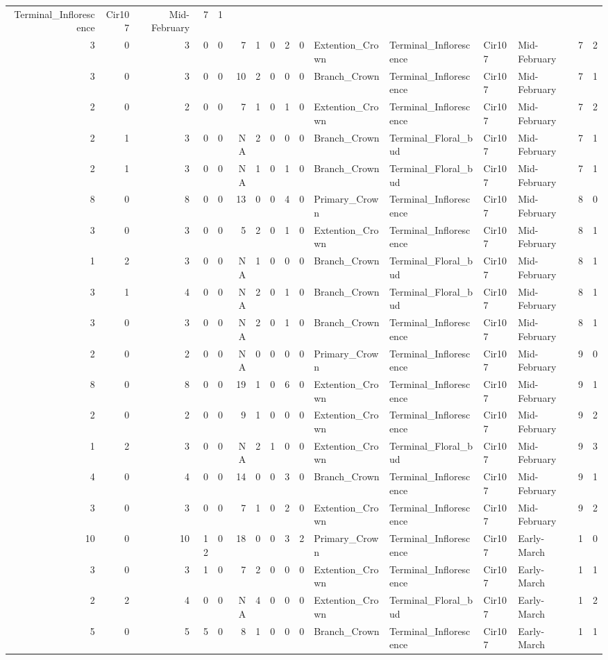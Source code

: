 \documentclass[]{article}
\begin{document}
\begin{longtable}[]{@{}rrrrrrrrrrllllrl@{}}
Terminal\_Inflorescence & Cir107 & Mid-February & 7 & 1\tabularnewline
3 & 0 & 3 & 0 & 0 & 7 & 1 & 0 & 2 & 0 & Extention\_Crown &
Terminal\_Inflorescence & Cir107 & Mid-February & 7 & 2\tabularnewline
3 & 0 & 3 & 0 & 0 & 10 & 2 & 0 & 0 & 0 & Branch\_Crown &
Terminal\_Inflorescence & Cir107 & Mid-February & 7 & 1\tabularnewline
2 & 0 & 2 & 0 & 0 & 7 & 1 & 0 & 1 & 0 & Extention\_Crown &
Terminal\_Inflorescence & Cir107 & Mid-February & 7 & 2\tabularnewline
2 & 1 & 3 & 0 & 0 & NA & 2 & 0 & 0 & 0 & Branch\_Crown &
Terminal\_Floral\_bud & Cir107 & Mid-February & 7 & 1\tabularnewline
2 & 1 & 3 & 0 & 0 & NA & 1 & 0 & 1 & 0 & Branch\_Crown &
Terminal\_Floral\_bud & Cir107 & Mid-February & 7 & 1\tabularnewline
8 & 0 & 8 & 0 & 0 & 13 & 0 & 0 & 4 & 0 & Primary\_Crown &
Terminal\_Inflorescence & Cir107 & Mid-February & 8 & 0\tabularnewline
3 & 0 & 3 & 0 & 0 & 5 & 2 & 0 & 1 & 0 & Extention\_Crown &
Terminal\_Inflorescence & Cir107 & Mid-February & 8 & 1\tabularnewline
1 & 2 & 3 & 0 & 0 & NA & 1 & 0 & 0 & 0 & Branch\_Crown &
Terminal\_Floral\_bud & Cir107 & Mid-February & 8 & 1\tabularnewline
3 & 1 & 4 & 0 & 0 & NA & 2 & 0 & 1 & 0 & Branch\_Crown &
Terminal\_Floral\_bud & Cir107 & Mid-February & 8 & 1\tabularnewline
3 & 0 & 3 & 0 & 0 & NA & 2 & 0 & 1 & 0 & Branch\_Crown &
Terminal\_Inflorescence & Cir107 & Mid-February & 8 & 1\tabularnewline
2 & 0 & 2 & 0 & 0 & NA & 0 & 0 & 0 & 0 & Primary\_Crown &
Terminal\_Inflorescence & Cir107 & Mid-February & 9 & 0\tabularnewline
8 & 0 & 8 & 0 & 0 & 19 & 1 & 0 & 6 & 0 & Extention\_Crown &
Terminal\_Inflorescence & Cir107 & Mid-February & 9 & 1\tabularnewline
2 & 0 & 2 & 0 & 0 & 9 & 1 & 0 & 0 & 0 & Extention\_Crown &
Terminal\_Inflorescence & Cir107 & Mid-February & 9 & 2\tabularnewline
1 & 2 & 3 & 0 & 0 & NA & 2 & 1 & 0 & 0 & Extention\_Crown &
Terminal\_Floral\_bud & Cir107 & Mid-February & 9 & 3\tabularnewline
4 & 0 & 4 & 0 & 0 & 14 & 0 & 0 & 3 & 0 & Branch\_Crown &
Terminal\_Inflorescence & Cir107 & Mid-February & 9 & 1\tabularnewline
3 & 0 & 3 & 0 & 0 & 7 & 1 & 0 & 2 & 0 & Extention\_Crown &
Terminal\_Inflorescence & Cir107 & Mid-February & 9 & 2\tabularnewline
10 & 0 & 10 & 12 & 0 & 18 & 0 & 0 & 3 & 2 & Primary\_Crown &
Terminal\_Inflorescence & Cir107 & Early-March & 1 & 0\tabularnewline
3 & 0 & 3 & 1 & 0 & 7 & 2 & 0 & 0 & 0 & Extention\_Crown &
Terminal\_Inflorescence & Cir107 & Early-March & 1 & 1\tabularnewline
2 & 2 & 4 & 0 & 0 & NA & 4 & 0 & 0 & 0 & Extention\_Crown &
Terminal\_Floral\_bud & Cir107 & Early-March & 1 & 2\tabularnewline
5 & 0 & 5 & 5 & 0 & 8 & 1 & 0 & 0 & 0 & Branch\_Crown &
Terminal\_Inflorescence & Cir107 & Early-March & 1 & 1\tabularnewline

\end{longtable}
\end{document}
